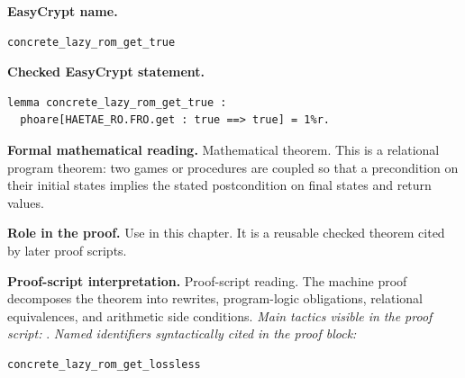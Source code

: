 \begin{formaltheorem}
\noindent\textbf{EasyCrypt name.}
\begin{lstlisting}[language=EasyCrypt,basicstyle=\ttfamily\scriptsize]
concrete_lazy_rom_get_true
\end{lstlisting}
\noindent\textbf{Checked EasyCrypt statement.}
\begin{lstlisting}[language=EasyCrypt,basicstyle=\ttfamily\scriptsize]
lemma concrete_lazy_rom_get_true :
  phoare[HAETAE_RO.FRO.get : true ==> true] = 1%r.
\end{lstlisting}
\noindent\textbf{Formal mathematical reading.}
Mathematical theorem. This is a relational program theorem: two games or procedures are coupled so that a precondition on their initial states implies the stated postcondition on final states and return values.

\noindent\textbf{Role in the proof.}
Use in this chapter. It is a reusable checked theorem cited by later proof scripts.

\noindent\textbf{Proof-script interpretation.}
Proof-script reading. The machine proof decomposes the theorem into rewrites, program-logic obligations, relational equivalences, and arithmetic side conditions.
\emph{Main tactics visible in the proof script:} .
\emph{Named identifiers syntactically cited in the proof block:}
\begin{lstlisting}[language=EasyCrypt,basicstyle=\ttfamily\scriptsize]
concrete_lazy_rom_get_lossless
\end{lstlisting}

\end{formaltheorem}

